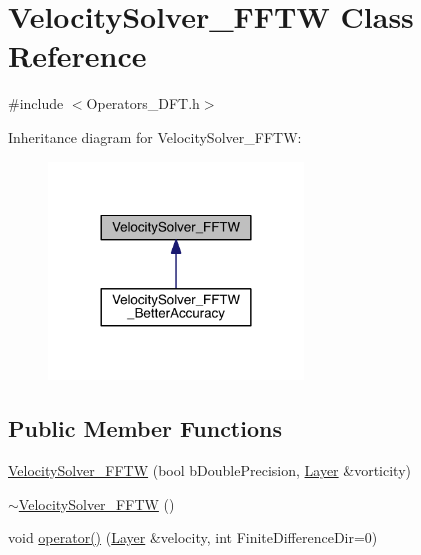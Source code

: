 \hypertarget{class_velocity_solver___f_f_t_w}{}\section{Velocity\+Solver\+\_\+\+F\+F\+T\+W Class Reference}
\label{class_velocity_solver___f_f_t_w}


{\ttfamily \#include $<$Operators\+\_\+\+D\+F\+T.\+h$>$}



Inheritance diagram for Velocity\+Solver\+\_\+\+F\+F\+T\+W\+:\nopagebreak
\begin{figure}[H]
\begin{center}
\leavevmode
\includegraphics[width=192pt]{d5/d57/class_velocity_solver___f_f_t_w__inherit__graph}
\end{center}
\end{figure}
\subsection*{Public Member Functions}
\begin{DoxyCompactItemize}
\item 
\hyperlink{class_velocity_solver___f_f_t_w_ae7c2966900d04a6a3cab0803ff42127f}{Velocity\+Solver\+\_\+\+F\+F\+T\+W} (bool b\+Double\+Precision, \hyperlink{struct_layer}{Layer} \&vorticity)
\item 
\hyperlink{class_velocity_solver___f_f_t_w_a6e7208c1edddd4f703a640847fe8c02a}{$\sim$\+Velocity\+Solver\+\_\+\+F\+F\+T\+W} ()
\item 
void \hyperlink{class_velocity_solver___f_f_t_w_a95cbb50d8bfc937b4d9bcd9a97b7228f}{operator()} (\hyperlink{struct_layer}{Layer} \&velocity, int Finite\+Difference\+Dir=0)
\end{DoxyCompactItemize}
